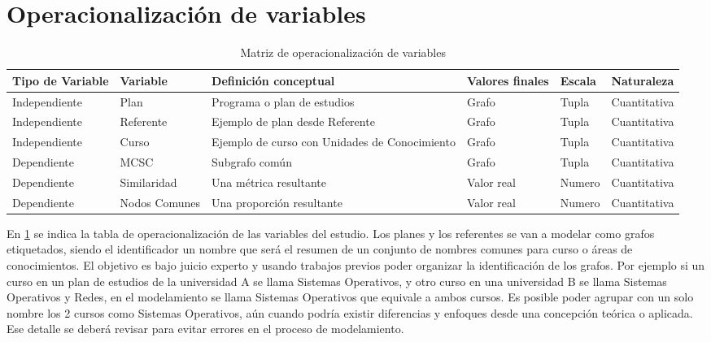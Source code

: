 \section{Operacionalización de variables}


\begin{table}[h!]
\centering
\caption{Matriz de operacionalización de variables}

\begin{tabularx}{1.0\textwidth}
{ 
  | >{\raggedleft\arraybackslash}X 
  | >{\raggedleft\arraybackslash}X 
  | >{\raggedright\arraybackslash}X 
  | >{\raggedright\arraybackslash}X 
  | >{\raggedright\arraybackslash}X 
  | >{\raggedright\arraybackslash}X  |}

\hline
Tipo de Variable&Variable&Definición conceptual&Valores finales&Escala&Naturaleza\\
\hline
\scriptsize
Independiente&
\scriptsize
Plan&
\scriptsize
Programa o plan de estudios&
\scriptsize
Grafo&
\scriptsize
Tupla&
\scriptsize
Cuantitativa\\
\hline
\scriptsize
Independiente&
\scriptsize
Referente&
\scriptsize
Ejemplo de plan desde Referente&
\scriptsize
Grafo&
\scriptsize
Tupla&
\scriptsize
Cuantitativa\\
\hline
\scriptsize
Independiente&
\scriptsize
Curso&
\scriptsize
Ejemplo de curso con Unidades de Conocimiento&
\scriptsize
Grafo&
\scriptsize
Tupla&
\scriptsize
Cuantitativa\\
\hline
\scriptsize
Dependiente&
\scriptsize
MCSC&
\scriptsize
Subgrafo común&
\scriptsize
Grafo&
\scriptsize
Tupla&
\scriptsize
Cuantitativa\\
\hline
\scriptsize
Dependiente&
\scriptsize
Similaridad&
\scriptsize
Una métrica resultante&
\scriptsize
Valor real&
\scriptsize
Numero&
\scriptsize
Cuantitativa\\
\hline
\scriptsize
Dependiente&
\scriptsize
Nodos Comunes&
\scriptsize
Una proporción resultante&
\scriptsize
Valor real&
\scriptsize
Numero&
\scriptsize
Cuantitativa\\
\hline
\end{tabularx}
\label{tab:opvar}
\end{table}

En  \ref{tab:opvar} se indica la tabla de operacionalización de las variables del estudio. Los planes y los referentes se van a modelar como grafos etiquetados, siendo el identificador un nombre que será el resumen de un conjunto de nombres comunes para curso o áreas de conocimientos. El objetivo es bajo juicio experto y usando trabajos previos poder organizar la identificación de los grafos. Por ejemplo si un curso en un plan de estudios de la universidad A se llama Sistemas Operativos, y otro curso en una universidad B se llama Sistemas Operativos y Redes, en el modelamiento se llama Sistemas Operativos que equivale a ambos cursos. Es posible poder agrupar con un solo nombre los 2 cursos como Sistemas Operativos, aún cuando podría existir diferencias y enfoques desde una concepción teórica o aplicada. Ese detalle se deberá revisar para evitar errores en el proceso de modelamiento.

